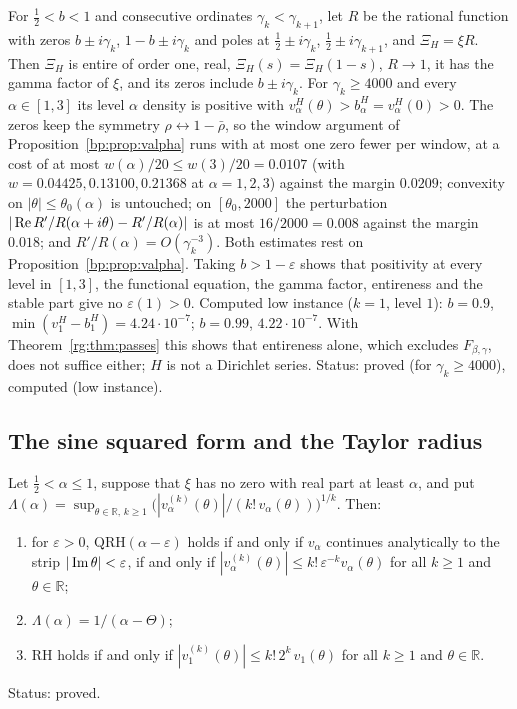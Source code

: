 \begin{remark}\label{rg:rem:controlH}
For $\frac12<b<1$ and consecutive ordinates $\gamma_k<\gamma_{k+1}$, let $R$ be the rational function with zeros $b\pm i\gamma_k$, $1-b\pm i\gamma_k$ and poles at $\frac12\pm i\gamma_k$, $\frac12\pm i\gamma_{k+1}$, and $\Xi_H=\xi R$. Then $\Xi_H$ is entire of order one, real, $\Xi_H(s)=\Xi_H(1-s)$, $R\to1$, it has the gamma factor of $\xi$, and its zeros include $b\pm i\gamma_k$. For $\gamma_k\ge4000$ and every $\alpha\in[1,3]$ its level $\alpha$ density is positive with $v^H_\alpha(\theta)>b^H_\alpha=v^H_\alpha(0)>0$. The zeros keep the symmetry $\rho\leftrightarrow1-\bar\rho$, so the window argument of Proposition~\ref{bp:prop:valpha} runs with at most one zero fewer per window, at a cost of at most $w(\alpha)/20\le w(3)/20=0.0107$ (with $w=0.04425,0.13100,0.21368$ at $\alpha=1,2,3$) against the margin $0.0209$; convexity on $|\theta|\le\theta_0(\alpha)$ is untouched; on $[\theta_0,2000]$ the perturbation $|\operatorname{Re} R'/R(\alpha+i\theta)-R'/R(\alpha)|$ is at most $16/2000=0.008$ against the margin $0.018$; and $R'/R(\alpha)=O(\gamma_k^{-3})$. Both estimates rest on Proposition~\ref{bp:prop:valpha}. Taking $b>1-\varepsilon$ shows that positivity at every level in $[1,3]$, the functional equation, the gamma factor, entireness and the stable part give no $\varepsilon(1)>0$. Computed low instance ($k=1$, level $1$): $b=0.9$, $\min(v^H_1-b^H_1)=4.24\cdot10^{-7}$; $b=0.99$, $4.22\cdot10^{-7}$. With Theorem~\ref{rg:thm:passes} this shows that entireness alone, which excludes $F_{\beta,\gamma}$, does not suffice either; $H$ is not a Dirichlet series. Status: proved (for $\gamma_k\ge4000$), computed (low instance).
\end{remark}

\subsection*{The sine squared form and the Taylor radius}

\begin{theorem}\label{rg:thm:taylor}
Let $\frac12<\alpha\le1$, suppose that $\xi$ has no zero with real part at least $\alpha$, and put $\Lambda(\alpha)=\sup_{\theta\in\mathbb R,\,k\ge1}\big(|v_\alpha^{(k)}(\theta)|/(k!\,v_\alpha(\theta))\big)^{1/k}$. Then:
\begin{enumerate}
\item[(a)] for $\varepsilon>0$, $\mathrm{QRH}(\alpha-\varepsilon)$ holds if and only if $v_\alpha$ continues analytically to the strip $|\operatorname{Im}\theta|<\varepsilon$, if and only if $|v_\alpha^{(k)}(\theta)|\le k!\,\varepsilon^{-k}v_\alpha(\theta)$ for all $k\ge1$ and $\theta\in\mathbb R$;
\item[(b)] $\Lambda(\alpha)=1/(\alpha-\Theta)$;
\item[(c)] RH holds if and only if $|v_1^{(k)}(\theta)|\le k!\,2^k\,v_1(\theta)$ for all $k\ge1$ and $\theta\in\mathbb R$.
\end{enumerate}
Status: proved.
\end{theorem}

